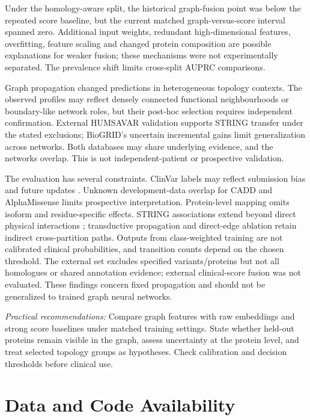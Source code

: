 \documentclass[conference]{IEEEtran}
\begin{document}
Under the homology-aware split, the historical graph-fusion point was below the repeated score baseline, but the current matched graph-versus-score interval spanned zero. Additional input weights, redundant high-dimensional features, overfitting, feature scaling and changed protein composition are possible explanations for weaker fusion; these mechanisms were not experimentally separated. The prevalence shift limits cross-split AUPRC comparisons.

Graph propagation changed predictions in heterogeneous topology contexts. The observed profiles may reflect densely connected functional neighbourhoods or boundary-like network roles, but their post-hoc selection requires independent confirmation. External HUMSAVAR validation supports STRING transfer under the stated exclusions; BioGRID's uncertain incremental gains limit generalization across networks. Both databases may share underlying evidence, and the networks overlap. This is not independent-patient or prospective validation.

The evaluation has several constraints. ClinVar labels may reflect submission bias and future updates \cite{Landrum2020ClinVar}. Unknown development-data overlap for CADD and AlphaMissense limits prospective interpretation. Protein-level mapping omits isoform and residue-specific effects. STRING associations extend beyond direct physical interactions \cite{Szklarczyk2023STRING}; transductive propagation and direct-edge ablation retain indirect cross-partition paths. Outputs from class-weighted training are not calibrated clinical probabilities, and transition counts depend on the chosen threshold. The external set excludes specified variants/proteins but not all homologues or shared annotation evidence; external clinical-score fusion was not evaluated. These findings concern fixed propagation and should not be generalized to trained graph neural networks.

\noindent\textit{Practical recommendations:}
Compare graph features with raw embeddings and strong score baselines under matched training settings. State whether held-out proteins remain visible in the graph, assess uncertainty at the protein level, and treat selected topology groups as hypotheses. Check calibration and decision thresholds before clinical use.

\section*{Data and Code Availability}
\end{document}
